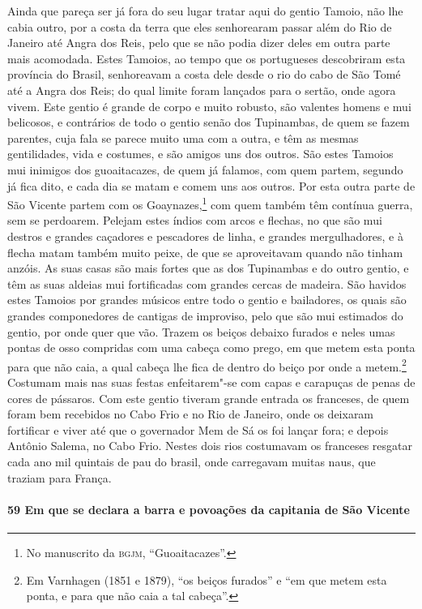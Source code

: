 Ainda que pareça ser já fora do seu lugar tratar aqui do gentio Tamoio, não lhe cabia
outro, por a costa da terra que eles senhorearam passar além do Rio de Janeiro até Angra
dos Reis, pelo que se não podia dizer deles em outra parte mais acomodada. Estes Tamoios,
ao tempo que os portugueses descobriram esta província do Brasil, senhoreavam a costa dele
desde o rio do cabo de São Tomé até a Angra dos Reis; do qual limite foram lançados para o
sertão, onde agora vivem. Este gentio é grande de corpo e muito robusto, são valentes
homens e mui belicosos, e contrários de todo o gentio senão dos Tupinambas, de quem se
fazem parentes, cuja fala se parece muito uma com a outra, e têm as mesmas gentilidades,
vida e costumes, e são amigos uns dos outros. São estes Tamoios mui inimigos dos
guoaitacazes, de quem já falamos, com quem partem, segundo já fica dito, e cada dia se
matam e comem uns aos outros. Por esta outra parte de São Vicente partem com os
Goaynazes,\footnote{ No manuscrito da \textsc{bgjm}, ``Guoaitacazes''.} com quem também
têm contínua guerra, sem se perdoarem. Pelejam estes índios com arcos e flechas, no que
são mui destros e grandes caçadores e pescadores de linha, e grandes mergulhadores, e à
flecha matam também muito peixe, de que se aproveitavam quando não tinham anzóis. As suas
casas são mais fortes que as dos Tupinambas e do outro gentio, e têm as suas aldeias mui
fortificadas com grandes cercas de madeira. São havidos estes Tamoios por grandes músicos
entre todo o gentio e bailadores, os quais são grandes componedores de cantigas de
improviso, pelo que são mui estimados do gentio, por onde quer que vão. Trazem os beiços
debaixo furados e neles umas pontas de osso compridas com uma cabeça como prego, em que
metem esta ponta para que não caia, a qual cabeça lhe fica de dentro do beiço por onde a
metem.\footnote{ Em Varnhagen (1851 e 1879), ``os beiços furados'' e ``em que metem esta
ponta, e para que não caia a tal cabeça''.} Costumam mais nas suas festas enfeitarem"-se
com capas e carapuças de penas de cores de pássaros. Com este gentio tiveram grande
entrada os franceses, de quem foram bem recebidos no Cabo Frio e no Rio de Janeiro, onde
os deixaram fortificar e viver até que o governador Mem de Sá os foi lançar fora; e depois
Antônio Salema, no Cabo Frio. Nestes dois rios costumavam os franceses resgatar cada ano
mil quintais de pau do brasil, onde carregavam muitas naus, que traziam para França.

\paragraph{59 Em que se declara a barra e povoações da capitania de São Vicente}

